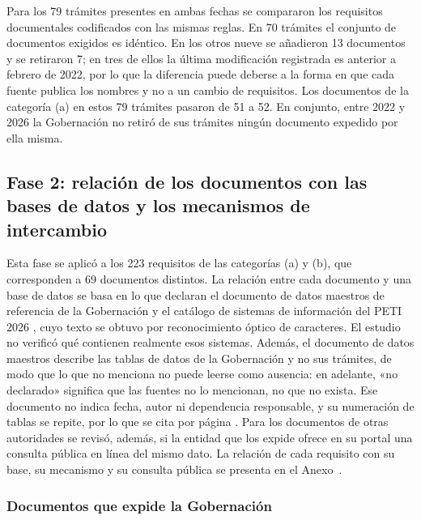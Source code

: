 Para los 79 trámites presentes en ambas fechas se compararon los requisitos documentales codificados con las mismas reglas. En 70 trámites el conjunto de documentos exigidos es idéntico. En los otros nueve se añadieron 13 documentos y se retiraron 7; en tres de ellos la última modificación registrada es anterior a febrero de 2022, por lo que la diferencia puede deberse a la forma en que cada fuente publica los nombres y no a un cambio de requisitos. Los documentos de la categoría (a) en estos 79 trámites pasaron de 51 a 52. En conjunto, entre 2022 y 2026 la Gobernación no retiró de sus trámites ningún documento expedido por ella misma.

\subsection{Fase 2: relación de los documentos con las bases de datos y los mecanismos de intercambio}

Esta fase se aplicó a los 223 requisitos de las categorías (a) y (b), que corresponden a 69 documentos distintos. La relación entre cada documento y una base de datos se basa en lo que declaran el documento de datos maestros de referencia de la Gobernación \parencite{gobernaciondelhuila2026datosmaestros} y el catálogo de sistemas de información del PETI 2026 \parencite[pp.~34-37]{gobernaciondelhuila2026peti}, cuyo texto se obtuvo por reconocimiento óptico de caracteres. El estudio no verificó qué contienen realmente esos sistemas. Además, el documento de datos maestros describe las tablas de datos de la Gobernación y no sus trámites, de modo que lo que no menciona no puede leerse como ausencia: en adelante, «no declarado» significa que las fuentes no lo mencionan, no que no exista. Ese documento no indica fecha, autor ni dependencia responsable, y su numeración de tablas se repite, por lo que se cita por página . Para los documentos de otras autoridades se revisó, además, si la entidad que los expide ofrece en su portal una consulta pública en línea del mismo dato. La relación de cada requisito con su base, su mecanismo y su consulta pública se presenta en el Anexo~.

\subsubsection{Documentos que expide la Gobernación}

